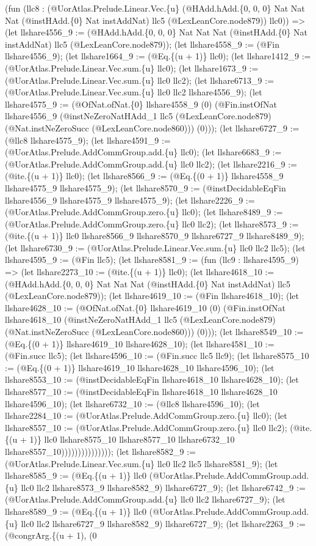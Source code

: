 \documentclass[11pt]{article}
\begin{document}
(fun (llc8 : (@UorAtlas.Prelude.Linear.Vec.\{u\} (@HAdd.hAdd.\{0, 0, 0\} Nat Nat Nat (@instHAdd.\{0\} Nat instAddNat) llc5 (@LexLeanCore.node879)) llc0)) => (let llshare4556\_9 := (@HAdd.hAdd.\{0, 0, 0\} Nat Nat Nat (@instHAdd.\{0\} Nat instAddNat) llc5 (@LexLeanCore.node879)); (let llshare4558\_9 := (@Fin llshare4556\_9); (let llshare1664\_9 := (@Eq.\{(u + 1)\} llc0); (let llshare1412\_9 := (@UorAtlas.Prelude.Linear.Vec.sum.\{u\} llc0); (let llshare1673\_9 := (@UorAtlas.Prelude.Linear.Vec.sum.\{u\} llc0 llc2); (let llshare6713\_9 := (@UorAtlas.Prelude.Linear.Vec.sum.\{u\} llc0 llc2 llshare4556\_9); (let llshare4575\_9 := (@OfNat.ofNat.\{0\} llshare4558\_9 (0) (@Fin.instOfNat llshare4556\_9 (@instNeZeroNatHAdd\_1 llc5 (@LexLeanCore.node879) (@Nat.instNeZeroSucc (@LexLeanCore.node860))) (0))); (let llshare6727\_9 := (@llc8 llshare4575\_9); (let llshare4591\_9 := (@UorAtlas.Prelude.AddCommGroup.add.\{u\} llc0); (let llshare6683\_9 := (@UorAtlas.Prelude.AddCommGroup.add.\{u\} llc0 llc2); (let llshare2216\_9 := (@ite.\{(u + 1)\} llc0); (let llshare8566\_9 := (@Eq.\{(0 + 1)\} llshare4558\_9 llshare4575\_9 llshare4575\_9); (let llshare8570\_9 := (@instDecidableEqFin llshare4556\_9 llshare4575\_9 llshare4575\_9); (let llshare2226\_9 := (@UorAtlas.Prelude.AddCommGroup.zero.\{u\} llc0); (let llshare8489\_9 := (@UorAtlas.Prelude.AddCommGroup.zero.\{u\} llc0 llc2); (let llshare8573\_9 := (@ite.\{(u + 1)\} llc0 llshare8566\_9 llshare8570\_9 llshare6727\_9 llshare8489\_9); (let llshare6730\_9 := (@UorAtlas.Prelude.Linear.Vec.sum.\{u\} llc0 llc2 llc5); (let llshare4595\_9 := (@Fin llc5); (let llshare8581\_9 := (fun (llc9 : llshare4595\_9) => (let llshare2273\_10 := (@ite.\{(u + 1)\} llc0); (let llshare4618\_10 := (@HAdd.hAdd.\{0, 0, 0\} Nat Nat Nat (@instHAdd.\{0\} Nat instAddNat) llc5 (@LexLeanCore.node879)); (let llshare4619\_10 := (@Fin llshare4618\_10); (let llshare4628\_10 := (@OfNat.ofNat.\{0\} llshare4619\_10 (0) (@Fin.instOfNat llshare4618\_10 (@instNeZeroNatHAdd\_1 llc5 (@LexLeanCore.node879) (@Nat.instNeZeroSucc (@LexLeanCore.node860))) (0))); (let llshare8549\_10 := (@Eq.\{(0 + 1)\} llshare4619\_10 llshare4628\_10); (let llshare4581\_10 := (@Fin.succ llc5); (let llshare4596\_10 := (@Fin.succ llc5 llc9); (let llshare8575\_10 := (@Eq.\{(0 + 1)\} llshare4619\_10 llshare4628\_10 llshare4596\_10); (let llshare8553\_10 := (@instDecidableEqFin llshare4618\_10 llshare4628\_10); (let llshare8577\_10 := (@instDecidableEqFin llshare4618\_10 llshare4628\_10 llshare4596\_10); (let llshare6732\_10 := (@llc8 llshare4596\_10); (let llshare2284\_10 := (@UorAtlas.Prelude.AddCommGroup.zero.\{u\} llc0); (let llshare8557\_10 := (@UorAtlas.Prelude.AddCommGroup.zero.\{u\} llc0 llc2); (@ite.\{(u + 1)\} llc0 llshare8575\_10 llshare8577\_10 llshare6732\_10 llshare8557\_10))))))))))))))); (let llshare8582\_9 := (@UorAtlas.Prelude.Linear.Vec.sum.\{u\} llc0 llc2 llc5 llshare8581\_9); (let llshare8585\_9 := (@Eq.\{(u + 1)\} llc0 (@UorAtlas.Prelude.AddCommGroup.add.\{u\} llc0 llc2 llshare8573\_9 llshare8582\_9) llshare6727\_9); (let llshare6742\_9 := (@UorAtlas.Prelude.AddCommGroup.add.\{u\} llc0 llc2 llshare6727\_9); (let llshare8589\_9 := (@Eq.\{(u + 1)\} llc0 (@UorAtlas.Prelude.AddCommGroup.add.\{u\} llc0 llc2 llshare6727\_9 llshare8582\_9) llshare6727\_9); (let llshare2263\_9 := (@congrArg.\{(u + 1), (0 
\end{document}
